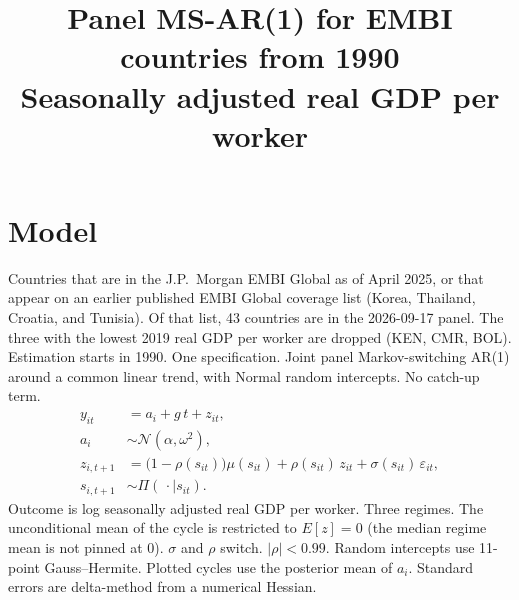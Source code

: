 \documentclass[11pt]{article}
\title{Panel MS-AR(1) for EMBI countries from 1990\\[0.4em]\large Seasonally adjusted real GDP per worker}
\author{}
\date{}
\begin{document}
\maketitle
\section{Model}
Countries that are in the J.P.\ Morgan EMBI Global as of April 2025, or that appear on an earlier published EMBI Global coverage list (Korea, Thailand, Croatia, and Tunisia). Of that list, 43 countries are in the 2026-09-17 panel. The three with the lowest 2019 real GDP per worker are dropped (KEN, CMR, BOL). Estimation starts in 1990.
One specification. Joint panel Markov-switching AR(1) around a common linear trend, with Normal random intercepts. No catch-up term.
\begin{align}
y_{it} &= a_i + g\, t + z_{it}, \\
a_i &\sim \mathcal{N}(\alpha,\omega^2), \\
z_{i,t+1} &= \bigl(1-\rho(s_{it})\bigr)\mu(s_{it}) + \rho(s_{it})\, z_{it} + \sigma(s_{it})\,\varepsilon_{it}, \\
s_{i,t+1} &\sim \Pi(\,\cdot\mid s_{it}).
\end{align}
Outcome is log seasonally adjusted real GDP per worker. Three regimes. The unconditional mean of the cycle is restricted to $E[z]=0$ (the median regime mean is not pinned at 0). $\sigma$ and $\rho$ switch. $|\rho|<0.99$. Random intercepts use 11-point Gauss--Hermite. Plotted cycles use the posterior mean of $a_i$. Standard errors are delta-method from a numerical Hessian.
\clearpage
\end{document}
